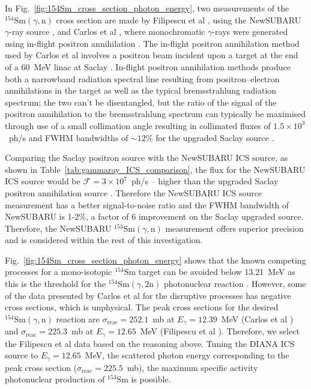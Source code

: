 \documentclass[../main.tex]{subfiles}
\begin{document}
In Fig.~\ref{fig:154Sm_cross_section_photon_energy}, two measurements of the $^{154}\mathrm{Sm}\left(\gamma,\mathrm{n}\right)$ cross section are made by Filipescu et al \cite{filipescu2014photoneutron}, using the NewSUBARU $\gamma$-ray source \cite{utsunomiya2015gamma}, and Carlos et al \cite{carlos1974giant}, where monochromatic $\gamma$-rays were generated using in-flight positron annihilation \cite{miller1960monochromatic}. The in-flight positron annihilation method used by Carlos et al involves a positron beam incident upon a target at the end of a 60~\si{\mega\electronvolt} linac at Saclay \cite{audit1970etude}. In-flight positron annihilation methods produce both a narrowband radiation spectral line resulting from positron--electron annihilations in the target as well as the typical bremsstrahlung radiation spectrum; the two can't be disentangled, but the ratio of the signal of the positron annihilation to the bremsstrahlung spectrum can typically be maximised through use of a small collimation angle resulting in collimated fluxes of $1.5\times10^{3}$~ph/\si{\second} and FWHM bandwidths of $\sim 12$\% for the upgraded Saclay source \cite{veyssiere1979quasi}.

Comparing the Saclay positron source with the NewSUBARU ICS source, as shown in Table~\ref{tab:gammaray_ICS_comparison}, the flux for the NewSUBARU ICS source would be $\mathcal{F}=3\times 10^{7}$~ph/\si{\second} -- higher than the upgraded Saclay positron annihilation source \cite{veyssiere1979quasi}. Therefore the NewSUBARU ICS source measurement has a better signal-to-noise ratio and the FWHM bandwidth of NewSUBARU is 1-2\%, a factor of 6 improvement on the Saclay upgraded source. Therefore, the NewSUBARU $^{153}\mathrm{Sm}\left(\gamma,\mathrm{n}\right)$ measurement offers superior precision and is considered within the rest of this investigation.  

Fig.~\ref{fig:154Sm_cross_section_photon_energy} shows that the known competing processes for a mono-isotopic $^{154}\mathrm{Sm}$ target can be avoided below 13.21~\si{\mega\electronvolt} as this is the threshold for the $^{154}\mathrm{Sm}\left(\gamma,2\mathrm{n}\right)$ photonuclear reaction \cite{carlos1974giant}. However, some of the data presented by Carlos et al \cite{carlos1974giant} for the disruptive processes has negative cross sections, which is unphysical. The peak cross sections for the desired $^{154}\mathrm{Sm}\left(\gamma,\mathrm{n}\right)$ reaction are $\sigma_{\mathrm{reac}} = 252.1$~\si{\milli\barn} at $E_{\gamma} = 12.39$~\si{\mega\electronvolt} (Carlos et al \cite{carlos1974giant}) and $\sigma_{\mathrm{reac}} = 225.3$~\si{\milli\barn} at $E_{\gamma} = 12.65$~\si{\mega\electronvolt} (Filipescu et al \cite{filipescu2014photoneutron}). Therefore, we select the Filipescu et al \cite{filipescu2014photoneutron} data based on the reasoning above. Tuning the DIANA ICS source to $E_{\gamma}=12.65$~\si{\mega\electronvolt}, the scattered photon energy  corresponding to the peak cross section ($\sigma_{\mathrm{reac}}=225.5$~\si{\milli\barn}), the maximum specific activity photonuclear production of $^{153}\mathrm{Sm}$ is possible.
\end{document}
